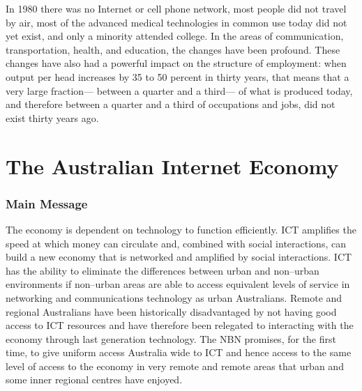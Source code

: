 \begin{savequote}[10cm] %
\sffamily
 In 1980 there was no Internet or cell phone network, most people did not travel by air, most of the advanced medical technologies in common use today did not yet exist, and only a minority attended college. In the areas of communication, transportation, health, and education, the changes have been profound. These changes have also had a powerful impact on the structure of employment: when output per head increases by 35 to 50 percent in thirty years, that means that a very large fraction— between a quarter and a third— of what is produced today, and therefore between a quarter and a third of occupations and jobs, did not exist thirty years ago.\cite{RefWorks:447}
\end{savequote}

\chapter{The Australian Internet Economy}

\subsection{Main Message}
The economy is dependent on technology to function efficiently. ICT amplifies the speed at which money can circulate and, combined with social interactions, can build a new economy that is networked and amplified by social interactions. ICT has the ability to eliminate the differences between urban and non--urban environments if non--urban areas are able to access equivalent levels of service in networking and communications technology as urban Australians. Remote and regional Australians have been historically disadvantaged by not having good access to ICT resources and have therefore been relegated to interacting with the economy through last generation technology. The NBN promises, for the first time, to give uniform access Australia wide to ICT and hence access to the same level of access to the economy in very remote and remote areas that urban and some inner regional centres have enjoyed.

